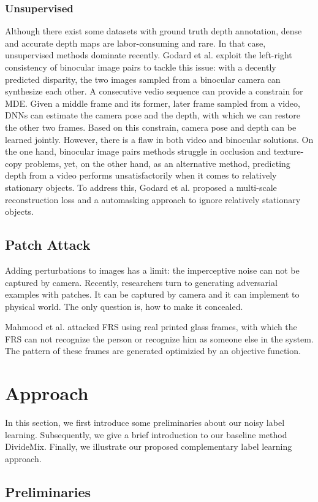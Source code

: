 \documentclass[10pt,twocolumn,letterpaper]{article}
\begin{document}
\subsubsection{Unsupervised}
Although there exist some datasets with ground truth depth 
annotation, dense and accurate depth maps are labor-consuming and rare. 
In that case, unsupervised methods dominate recently.
Godard et al. exploit the left-right consistency of binocular image pairs
to tackle this issue: 
with a decently predicted disparity, 
the two images sampled from a binocular camera can synthesize each other. 
A consecutive vedio sequence can provide a constrain for MDE.
Given a middle frame and its former, later frame sampled from a video, 
DNNs can estimate the camera pose and the depth, with which we can 
restore the other two frames. Based on this constrain, camera pose 
and depth can be learned jointly.
However, there is a flaw in both video and binocular solutions.
On the one hand, binocular image pairs methods struggle in occlusion 
and texture-copy problems, yet, on the other hand, as an alternative method, 
predicting depth from a video performs unsatisfactorily 
when it comes to relatively stationary objects.
To address this, Godard et al. proposed a multi-scale reconstruction
loss and a automasking approach to ignore relatively stationary objects.
\subsection{Patch Attack}
Adding perturbations to images has a limit: 
the imperceptive noise can not be captured by camera.
Recently, researchers turn to generating adversarial examples with
patches. It can be captured by camera and it can implement to physical
world. The only question is, how to make it concealed.

Mahmood et al. attacked FRS using real printed glass frames, 
with which the FRS can not recognize the person or recognize him
as someone else in the system. The pattern of these frames are
generated optimizied by an objective function.

\section{Approach}
In this section, we first introduce some preliminaries about our noisy label learning. Subsequently, we give a brief introduction to our baseline method DivideMix\cite{li2020dividemix}. Finally, we illustrate our proposed complementary label learning approach.
\subsection{Preliminaries}
\end{document}
